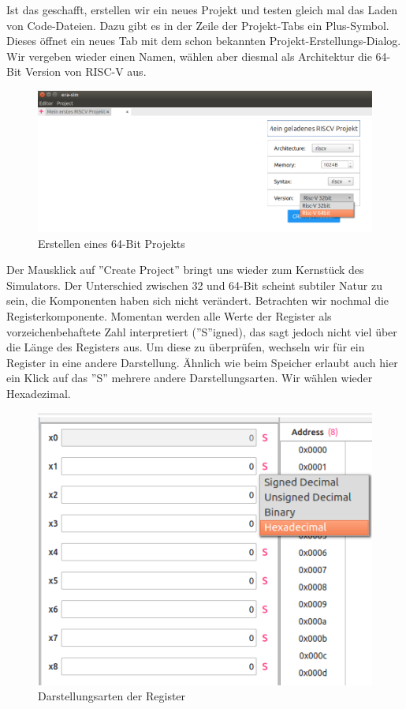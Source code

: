 Ist das geschafft, erstellen wir ein neues Projekt und testen gleich mal das Laden von Code-Dateien. Dazu gibt es in der Zeile der Projekt-Tabs ein Plus-Symbol. Dieses öffnet ein neues Tab mit dem schon bekannten Projekt-Erstellungs-Dialog. Wir vergeben wieder einen Namen, wählen aber diesmal als Architektur die 64-Bit Version von RISC-V aus.
\begin{figure}[H]
	\centering
	\includegraphics[scale=0.65]{Images/first-steps-8.png}
	\caption{Erstellen eines 64-Bit Projekts}
\end{figure}

Der Mausklick auf ''Create Project'' bringt uns wieder zum Kernstück des Simulators. Der Unterschied zwischen 32 und 64-Bit scheint subtiler Natur zu sein, die Komponenten haben sich nicht verändert.  Betrachten wir nochmal die Registerkomponente. Momentan werden alle Werte der Register als vorzeichenbehaftete Zahl interpretiert (''S''igned), das sagt jedoch nicht viel über die Länge des Registers aus. Um diese zu überprüfen, wechseln wir für ein Register in eine andere Darstellung. Ähnlich wie beim Speicher erlaubt auch hier ein Klick auf das ''S'' mehrere andere Darstellungsarten. Wir wählen wieder Hexadezimal.
\begin{figure}[H]
	\centering
	\includegraphics[scale=1.0]{Images/first-steps-9.png}
	\caption{Darstellungsarten der Register}
\end{figure}

